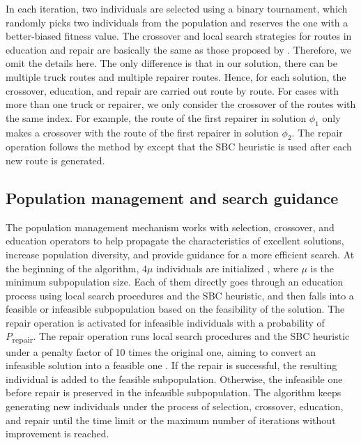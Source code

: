 In each iteration, two individuals are selected using a binary tournament, which randomly picks two
individuals from the population and reserves the one with a better-biased fitness value. The
crossover and local search strategies for routes in education and repair are basically the same as
those proposed by \citet{liMultipleTypeBike2016}. Therefore, we omit the details here. The only difference is that
in our solution, there can be multiple truck routes and multiple repairer routes. Hence, for each
solution, the crossover, education, and repair are carried out route by route. For cases with more
than one truck or repairer, we only consider the crossover of the routes with the same index. For
example, the route of the first repairer in solution \(\phi_{1}\) only makes a crossover with the
route of the first repairer in solution \(\phi_{2}\). The repair operation follows the method by
\citet{vidalHybridGeneticSearch2022} except that the SBC heuristic is used after each new route is generated.

\subsection{Population management and search guidance}\label{ch4:subsec:population-management-search-guidance}

The population management mechanism works with selection, crossover, and education operators to help
propagate the characteristics of excellent solutions, increase population diversity, and provide
guidance for a more efficient search. At the beginning of the algorithm, \(4\mu\) individuals are
initialized \citep{liMultipleTypeBike2016}, where \(\mu\) is the minimum subpopulation size. Each of them
directly goes through an education process using local search procedures and the SBC heuristic, and
then falls into a feasible or infeasible subpopulation based on the feasibility of the solution. The
repair operation is activated for infeasible individuals with a probability of
\emph{P}\textsubscript{repair}. The repair operation runs local search procedures and the SBC
heuristic under a penalty factor of 10 times the original one, aiming to convert an infeasible
solution into a feasible one \citep{vidalHybridGeneticSearch2022}. If the repair is successful, the resulting individual is
added to the feasible subpopulation. Otherwise, the infeasible one before repair is preserved in the
infeasible subpopulation. The algorithm keeps generating new individuals under the process of
selection, crossover, education, and repair until the time limit or the maximum number of iterations
without improvement is reached.

